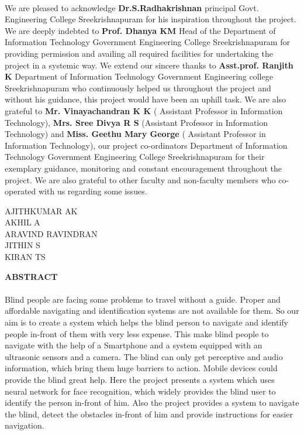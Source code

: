 \documentclass[11pt,a4paper,twoside]{report}
\begin{document}
\paragraph{ }
We are pleased to acknowledge \textbf{Dr.S.Radhakrishnan} principal Govt. Engineering College Sreekrishnapuram for his inspiration throughout the project. We are deeply indebted to \textbf{Prof. Dhanya KM} Head of the Department of Information Technology Government Engineering College Sreekrishnapuram for providing permission and availing all required facilities for undertaking the project in a systemic way. We extend our sincere thanks to \textbf{Asst.prof. Ranjith K} Department of Information Technology Government Engineering college Sreekrishnapuram  who continuously helped us throughout the project and without his guidance, this project would have been an uphill task. We are also grateful to \textbf{Mr. Vinayachandran K K} ( Assistant Professor in Information Technology), \textbf{Mrs.
Sree Divya R S} (Assistant Professor in Information Technology) and  \textbf{Miss. Geethu Mary George} ( Assistant Professor in Information Technology), our project co-ordinators Department of Information Technology Government Engineering College Sreekrishnapuram for their exemplary guidance, monitoring and constant encouragement throughout the project. We are also grateful to other faculty and non-faculty members who co-operated with us regarding some issues.
\begin{flushright}
AJITHKUMAR AK\\
AKHIL A\\
ARAVIND RAVINDRAN\\
JITHIN S\\
KIRAN TS
\end{flushright}
\newpage
{}
\setcounter{page}{0}

\begin{center}
\begin{Large}
\textbf{ABSTRACT}
\end{Large}
\end{center}
\paragraph{ }
Blind people are facing some problems to travel without a guide. Proper and affordable navigating and identification systems are not available for them. So our aim is to create a system which helps the blind person to navigate and identify people in-front of them with very less expense. This make blind people to navigate with the help of a Smartphone and a system equipped with an ultrasonic sensors and a camera. The blind can only get perceptive and audio information, which bring them huge barriers to action. Mobile devices could provide the blind great help. Here the project presents a system which uses neural network for face recognition, which widely provides the blind user to identify the person in-front of him. Also the  project provides a system to navigate the blind, detect the obstacles in-front of him and provide instructions for easier navigation.
\end{document}
